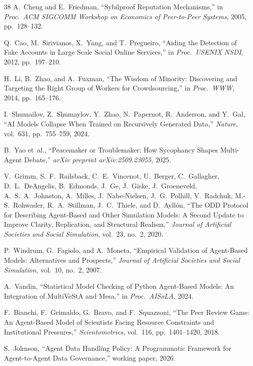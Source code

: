 \documentclass[11pt]{article}
\begin{document}
\begin{thebibliography}{38}
A.~Cheng and E.~Friedman, ``Sybilproof Reputation Mechanisms,'' in \textit{Proc.\ ACM SIGCOMM Workshop on Economics of Peer-to-Peer Systems}, 2005, pp.~128--132.

Q.~Cao, M.~Sirivianos, X.~Yang, and T.~Pregueiro, ``Aiding the Detection of Fake Accounts in Large Scale Social Online Services,'' in \textit{Proc.\ USENIX NSDI}, 2012, pp.~197--210.

H.~Li, B.~Zhao, and A.~Fuxman, ``The Wisdom of Minority: Discovering and Targeting the Right Group of Workers for Crowdsourcing,'' in \textit{Proc.\ WWW}, 2014, pp.~165--176.

I.~Shumailov, Z.~Shumaylov, Y.~Zhao, N.~Papernot, R.~Anderson, and Y.~Gal, ``AI Models Collapse When Trained on Recursively Generated Data,'' \textit{Nature}, vol.~631, pp.~755--759, 2024.

B.~Yao et~al., ``Peacemaker or Troublemaker: How Sycophancy Shapes Multi-Agent Debate,'' \textit{arXiv preprint arXiv:2509.23055}, 2025.

V.~Grimm, S.~F.~Railsback, C.~E.~Vincenot, U.~Berger, C.~Gallagher, D.~L.~DeAngelis, B.~Edmonds, J.~Ge, J.~Giske, J.~Groeneveld, A.~S.~A.~Johnston, A.~Milles, J.~Nabe-Nielsen, J.~G.~Polhill, V.~Radchuk, M.-S.~Rohwader, R.~A.~Stillman, J.~C.~Thiele, and D.~Ayll{\'o}n, ``The ODD Protocol for Describing Agent-Based and Other Simulation Models: A Second Update to Improve Clarity, Replication, and Structural Realism,'' \textit{Journal of Artificial Societies and Social Simulation}, vol.~23, no.~2, 2020.

P.~Windrum, G.~Fagiolo, and A.~Moneta, ``Empirical Validation of Agent-Based Models: Alternatives and Prospects,'' \textit{Journal of Artificial Societies and Social Simulation}, vol.~10, no.~2, 2007.

A.~Vandin, ``Statistical Model Checking of Python Agent-Based Models: An Integration of MultiVeStA and Mesa,'' in \textit{Proc.\ AISoLA}, 2024.

F.~Bianchi, F.~Grimaldo, G.~Bravo, and F.~Squazzoni, ``The Peer Review Game: An Agent-Based Model of Scientists Facing Resource Constraints and Institutional Pressures,'' \textit{Scientometrics}, vol.~116, pp.~1401--1420, 2018.

S.~Johnson, ``Agent Data Handling Policy: A Programmatic Framework for Agent-to-Agent Data Governance,'' working paper, 2026.


\end{thebibliography}
\end{document}
